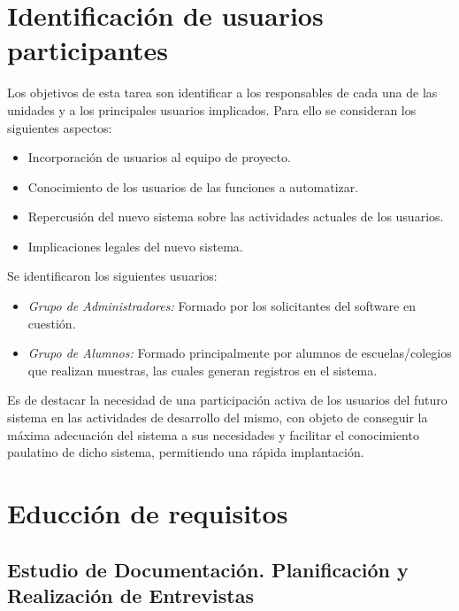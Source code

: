 \section{Identificación de usuarios participantes}

Los objetivos de esta tarea son identificar a los responsables de cada una de las unidades y a los principales usuarios implicados. Para ello se consideran los siguientes aspectos:

\begin{itemize}
    \item Incorporación de usuarios al equipo de proyecto.
    \item Conocimiento de los usuarios de las funciones a automatizar.
    \item Repercusión del nuevo sistema sobre las actividades actuales de los usuarios.
    \item Implicaciones legales del nuevo sistema.
 
\end{itemize}

Se identificaron los siguientes usuarios:

 \begin{itemize}
 
\item \emph{Grupo de Administradores:} Formado por los solicitantes del software en cuestión.
 
\item \emph{Grupo de Alumnos:} Formado principalmente por alumnos de escuelas/colegios que realizan muestras, las cuales generan registros en el sistema.

 \end{itemize}
 
 Es de destacar la necesidad de una participación activa de los usuarios del futuro sistema en las actividades de desarrollo del mismo, con objeto de conseguir la máxima adecuación del sistema a sus necesidades y facilitar el conocimiento paulatino de dicho sistema, permitiendo una rápida implantación.

  \section{Educción de requisitos}

  \subsection{Estudio de Documentación. Planificación y Realización de Entrevistas}
  
